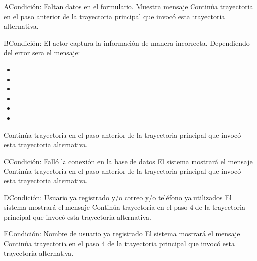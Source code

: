 	\begin{UCtrayectoriaA}{A}{Condición: Faltan datos en el formulario.}
		\UCpaso[\UCsist] Muestra mensaje 
		\UCpaso[\UCsist] Continúa trayectoria en el paso anterior de la trayectoria principal que invocó esta trayectoria alternativa. 
	\end{UCtrayectoriaA}
	\begin{UCtrayectoriaA}{B}{Condición: El actor captura la información de manera incorrecta.}
		\UCpaso[\UCsist] Dependiendo del error sera el mensaje:
			\begin{itemize}
			\item {}
			\item {}
			\item {}
			\item {}
			\item {}
			\item {}			
			\end{itemize}
		\UCpaso[\UCsist] Continúa trayectoria en el paso anterior de la trayectoria principal que invocó esta trayectoria alternativa. 
	\end{UCtrayectoriaA}
	\begin{UCtrayectoriaA}{C}{Condición: Falló la conexión en la base de datos}
		\UCpaso[\UCsist] El sistema mostrará el mensaje 
		\UCpaso[\UCsist] Continúa trayectoria en el paso anterior de la trayectoria principal que invocó esta trayectoria alternativa. 
	\end{UCtrayectoriaA}
	\begin{UCtrayectoriaA}{D}{Condición: Usuario ya registrado y/o correo y/o teléfono ya utilizados}
			\UCpaso[\UCsist] El sistema mostrará el mensaje 
			\UCpaso[\UCsist] Continúa trayectoria en el paso 4 de la trayectoria  principal que invocó esta trayectoria alternativa. 
	\end{UCtrayectoriaA}
	\begin{UCtrayectoriaA}{E}{Condición: Nombre de usuario ya registrado}
			\UCpaso[\UCsist] El sistema mostrará el mensaje 
			\UCpaso[\UCsist] Continúa trayectoria en el paso 4 de la trayectoria  principal que invocó esta trayectoria alternativa. 
	\end{UCtrayectoriaA}
